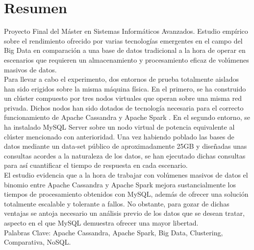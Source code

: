 \section*{Resumen}

Proyecto Final del Máster en Sistemas Informáticos Avanzados. Estudio empírico sobre el rendimiento ofrecido por varias tecnologías emergentes en el campo del Big Data en comparación a una base de datos tradicional a la hora de operar en escenarios que requieren un almacenamiento y procesamiento eficaz de volúmenes masivos de datos.\\

Para llevar a cabo el experimento, dos entornos de prueba totalmente aislados han sido erigidos sobre la misma máquina física. En el primero, se ha construido un clúster compuesto por tres nodos virtuales que operan sobre una misma red privada. Dichos nodos han sido dotados de tecnología necesaria para el correcto funcionamiento de Apache Cassandra \cite{lakshman2010cassandra} y Apache Spark \cite{zaharia2010spark}. En el segundo entorno, se ha instalado MySQL Server sobre un nodo virtual de potencia equivalente al clúster mencionado con anterioridad. Una vez habiendo poblado las bases de datos mediante un data-set público de aproximadamente 25GB y diseñadas unas consultas acordes a la naturaleza de los datos, se han ejecutado dichas consultas para así cuantificar el tiempo de respuesta en cada escenario.\\

El estudio evidencia que a la hora de trabajar con volúmenes masivos de datos el binomio entre Apache Cassandra y Apache Spark mejora sustancialmente los tiempos de procesamiento obtenidos con MySQL, además de ofrecer una solución totalmente escalable y tolerante a fallos. No obstante, para gozar de dichas ventajas  se antoja necesario un análisis previo de los datos que se desean tratar, aspecto en el que MySQL demuestra ofrecer una mayor libertad.\\


Palabras Clave: Apache Cassandra, Apache Spark, Big Data, Clustering, Comparativa, NoSQL.\\
